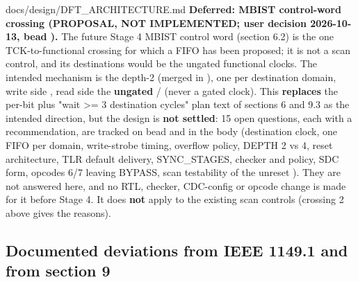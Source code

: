 \begin{relocated}{docs/design/DFT_ARCHITECTURE.md}
\textbf{Deferred: MBIST control-word crossing (PROPOSAL, NOT
IMPLEMENTED; user decision 2026-10-13, bead ).} The future
Stage 4 MBIST control word (section 6.2) is the one TCK-to-functional
crossing for which a FIFO has been proposed; it is not a scan control,
and its destinations would be the ungated functional clocks. The
intended mechanism is the depth-2  (merged in ), one per destination domain, write side , read side
the \textbf{ungated}  /  (never a
gated clock). This \textbf{replaces} the per-bit  plus
"wait \textgreater= 3 destination cycles" plan text of sections 6 and
9.3 as the intended direction, but the design is \textbf{not settled}:
15 open questions, each with a recommendation, are tracked on bead
 and in the  body (destination clock, one FIFO per
domain, write-strobe timing, overflow policy, DEPTH 2 vs 4, reset
architecture, TLR default delivery, SYNC\_\allowbreak{}STAGES, checker
and  policy, SDC form, opcodes 6/7 leaving BYPASS,
scan testability of the unreset ). They are not answered
here, and no RTL, checker, CDC-config or opcode change is made for it
before Stage 4. It does \textbf{not} apply to the existing scan controls
(crossing 2 above gives the reasons).

\subsection{Documented deviations from IEEE 1149.1 and from section
9}\label{tm:ch:dft-architecture:156-documented-deviations-from-ieee-11491-and-from-section-9}


\end{relocated}
